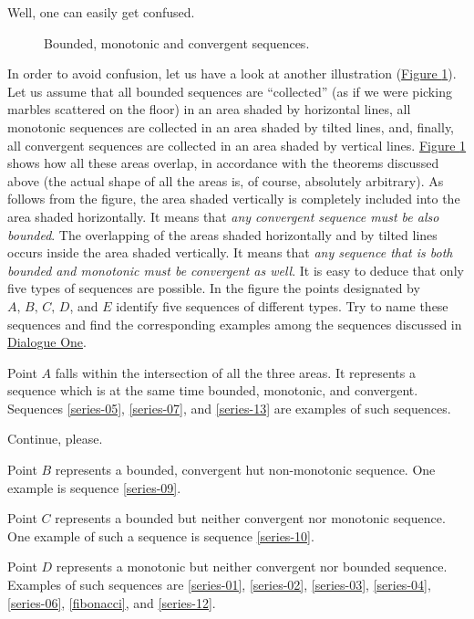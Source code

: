 {\rdr Well, one can easily get confused.

\begin{figure}[!h]
\centering

\caption{Bounded, monotonic and convergent sequences.}
\label{fig-08}
\end{figure}


\athr In order to avoid confusion, let us have a look at another illustration (\hyperref[fig-08]{Figure \ref{fig-08}}). Let us assume that all bounded sequences are ``collected'' (as if we were picking marbles scattered on the floor) in an area shaded by horizontal lines, all monotonic sequences are collected in an area shaded
by tilted lines, and, finally, all convergent sequences are collected in an area shaded by vertical lines. \hyperref[fig-08]{Figure \ref{fig-08}} shows how all these areas overlap, in accordance with the theorems discussed above (the actual shape of all the areas is, of course, absolutely arbitrary). As follows from the figure, the area shaded vertically is completely included into the area shaded horizontally. It means that \emph{any convergent sequence must be also bounded}. The overlapping of the areas shaded horizontally and by tilted lines occurs inside the area shaded vertically. It means that \emph{any sequence that is both bounded and monotonic must be convergent as well}. It is easy to deduce that only five types of sequences are possible. In the figure the points designated by $A, \, B, \, C, \, D$, and $E$ identify five sequences of different types. Try to name these sequences and find the corresponding examples among the sequences discussed in  \hyperref[infinite-seq]{Dialogue One}.

\rdr Point $A$ falls within the intersection of all the three areas. It represents a sequence which is at the same time bounded, monotonic, and convergent. Sequences \eqref{series-05}, \eqref{series-07}, and \eqref{series-13} are examples of such sequences.

\athr Continue, please.

\rdr Point $B$ represents a bounded, convergent hut non-monotonic sequence. One example is sequence \eqref{series-09}.

Point $C$ represents a bounded but neither convergent nor monotonic sequence. One example of such a sequence is sequence \eqref{series-10}.

Point $D$ represents a monotonic but neither convergent nor bounded sequence. Examples of such sequences are \eqref{series-01}, \eqref{series-02}, \eqref{series-03}, \eqref{series-04}, \eqref{series-06}, \eqref{fibonacci}, and \eqref{series-12}. 

}
